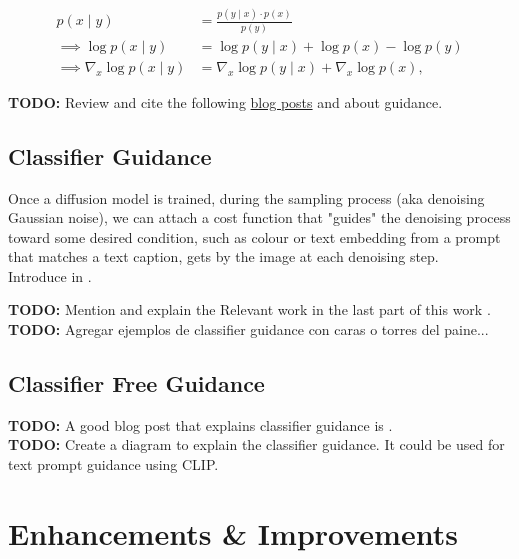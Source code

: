     \begin{equation}
         \begin{split}
            p(x \mid y) &= \frac{p(y \mid x) \cdot p(x)}{p(y)}\\
            \implies \log p(x \mid y) &= \log p(y \mid x) + \log p(x) - \log p(y) \\
            \implies \nabla_x \log p(x \mid y) &= \nabla_x \log p(y \mid x) + \nabla_x \log p(x) ,
        \end{split}
    \end{equation}
    

    \textbf{TODO:} Review and cite the following \href{https://sander.ai/2023/08/28/geometry.html}{blog posts} \cite{dieleman2022guidance} and \cite{dieleman2023geometry} about guidance.
\subsection{Classifier Guidance}

    Once a diffusion model is trained, during the sampling
    process (aka denoising Gaussian noise), we can attach
    a cost function that "guides" the denoising process toward
    some desired condition, such as colour or text embedding from a prompt that matches a text caption, gets by the image at each denoising step.\\ Introduce in \cite{nichol2021glide}.

    \textbf{TODO:} Mention and explain the Relevant work in the last part of this work \cite{Dhariwal2021DiffusionMB}.\\     

    \textbf{TODO:} Agregar ejemplos de classifier guidance con caras o torres del paine...\\     


    
\subsection{Classifier Free Guidance}

    \textbf{TODO:} A good blog post that explains classifier guidance is \cite{dieleman2022guidance}. \\

    \textbf{TODO:} Create a diagram to explain the classifier guidance. It could be used for text prompt guidance using CLIP.\\

\section{Enhancements \& Improvements}

